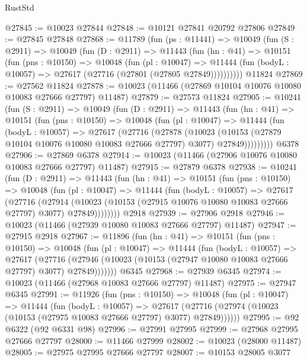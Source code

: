 \begin{lexlean}{RustStd}
\begin{coremodule}
@27845 := @10023 @27844
@27848 := @10121 @27841 @20792 @27806
@27849 := @27845 @27848
@27868 := @11789
    (fun (ps : @11441) =>
    @10049
      (fun (S : @2911) =>
      @10049
        (fun (D : @2911) =>
        @11443
          (fun (hn : @41) =>
          @10151
            (fun (pns : @10150) =>
            @10048
              (fun (pl : @10047) =>
              @11444 (fun (bodyL : @10057) => @27617 (@27716 (@27801 (@27805 @27849))))))))))
    @11824
@27869 := @27562 @11824
@27878 := @10023 (@11466 (@27869 @10104 @10076 @10080 @10083 @27666 @27797) @11487)
@27879 := @27573 @11824
@27905 := @10241
    (fun (S : @2911) =>
    @10049
      (fun (D : @2911) =>
      @11443
        (fun (hn : @41) =>
        @10151
          (fun (pns : @10150) =>
          @10048
            (fun (pl : @10047) =>
            @11444
              (fun (bodyL : @10057) =>
              @27617
                (@27716
                  (@27878
                    (@10023
                      (@10153 (@27879 @10104 @10076 @10080 @10083 @27666 @27797) @3077)
                      @27849)))))))))
    @6378
@27906 := @27869 @6378
@27914 := @10023 (@11466 (@27906 @10076 @10080 @10083 @27666 @27797) @11487)
@27915 := @27879 @6378
@27938 := @10241
    (fun (D : @2911) =>
    @11443
      (fun (hn : @41) =>
      @10151
        (fun (pns : @10150) =>
        @10048
          (fun (pl : @10047) =>
          @11444
            (fun (bodyL : @10057) =>
            @27617
              (@27716
                (@27914
                  (@10023 (@10153 (@27915 @10076 @10080 @10083 @27666 @27797) @3077) @27849))))))))
    @2918
@27939 := @27906 @2918
@27946 := @10023 (@11466 (@27939 @10080 @10083 @27666 @27797) @11487)
@27947 := @27915 @2918
@27967 := @11896
    (fun (hn : @41) =>
    @10151
      (fun (pns : @10150) =>
      @10048
        (fun (pl : @10047) =>
        @11444
          (fun (bodyL : @10057) =>
          @27617
            (@27716
              (@27946 (@10023 (@10153 (@27947 @10080 @10083 @27666 @27797) @3077) @27849)))))))
    @6345
@27968 := @27939 @6345
@27974 := @10023 (@11466 (@27968 @10083 @27666 @27797) @11487)
@27975 := @27947 @6345
@27991 := @11926
    (fun (pns : @10150) =>
    @10048
      (fun (pl : @10047) =>
      @11444
        (fun (bodyL : @10057) =>
        @27617 (@27716 (@27974 (@10023 (@10153 (@27975 @10083 @27666 @27797) @3077) @27849))))))
@27995 := @92 @6322 (@92 @6331 @98)
@27996 := @27991 @27995
@27999 := @27968 @27995 @27666 @27797
@28000 := @11466 @27999
@28002 := @10023 (@28000 @11487)
@28005 := @27975 @27995 @27666 @27797
@28007 := @10153 @28005 @3077

\end{coremodule}
\end{lexlean}
